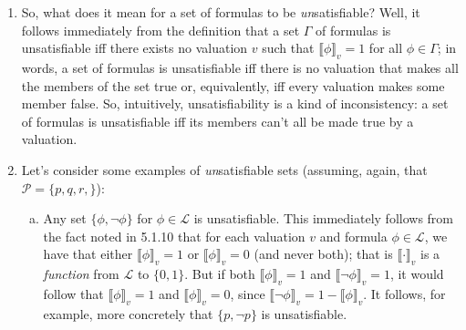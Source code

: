 \begin{enumerate}[\thesection.1]
\begin{enumerate}[(a)]
				\begin{proof}
				Let $\Gamma,\Delta\subseteq\mathcal{L}$ be sets of formulas such that $\Gamma$ is satisfiable and $\Delta\subseteq \Gamma$. That $\Gamma$ is satisfiable means, by definition, that there exists a valuation $v$ such that $\llbracket\phi\rrbracket_v=1$ for all $\phi\in\Gamma$. We need to show that  that there exists a valuation $v'$ such that $\llbracket\psi\rrbracket_{v'}=1$ for all $\psi\in\Delta$. But we can simply let $v'$ be $v$. For let $\psi$ be an arbitrary element of $\Delta$. Since $\Delta\subseteq\Gamma$, we have that $\psi\in\Gamma$. And we have that $\llbracket\phi\rrbracket_v=1$ for all $\phi\in\Gamma$, and so $\llbracket\psi\rrbracket_v=1$. Hence $\llbracket\psi\rrbracket_{v}=1$ for all $\psi\in\Delta$, as desired.
				\end{proof} 
				
				\item The set $\{p\lor\neg p\}$ is satisfiable since (as we proved in 5.2.11) $p\lor\neg p$ is true under \emph{every} valuation.
				
				\item The set $\{p\to q, \neg q\}$ is satisfiable since $v(p)=0,v(q)=0,$ and $v(r)$ arbitrary defines a valuation that makes both $p\to q$ and $\neg q$ true.				
			
			\end{enumerate}
			
		\item So, what does it mean for a set of formulas to be \emph{un}satisfiable? Well, it follows immediately from the definition that a set $\Gamma$ of formulas is unsatisfiable iff there exists no valuation $v$ such that $\llbracket\phi\rrbracket_v=1$ for all $\phi\in\Gamma$; in words, a set of formulas is unsatisfiable iff there is no valuation that makes all the members of the set true or, equivalently, iff every valuation makes some member false. So, intuitively, unsatisfiability is a kind of inconsistency: a set of formulas is unsatisfiable iff its members can't all be made true by a valuation.
		
		\item Let's consider some examples of \emph{un}satisfiable sets (assuming, again, that $\mathcal{P}=\{p,q,r,\}$):
		
		\begin{enumerate}[(a)]
		
			\item Any set $\{\phi, \neg \phi\}$ for $\phi\in\mathcal{L}$ is unsatisfiable. This immediately follows from the fact noted in 5.1.10 that for each valuation $v$ and formula $\phi\in\mathcal{L}$, we have that either $\llbracket\phi\rrbracket_v=1$ or $\llbracket\phi\rrbracket_v=0$ (and never both); that is $\llbracket\cdot\rrbracket_v$ is a \emph{function} from $\mathcal{L}$ to $\{0,1\}$. But if both $\llbracket\phi\rrbracket_v=1$ and $\llbracket\neg \phi\rrbracket_v=1$, it would follow that $\llbracket\phi\rrbracket_v=1$ and $\llbracket\phi\rrbracket_v=0$, since $\llbracket\neg\phi\rrbracket_v=1-\llbracket\phi\rrbracket_v$. It follows, for example, more concretely that $\{p,\neg p\}$ is unsatisfiable. 
	

\end{enumerate}
\end{enumerate}
